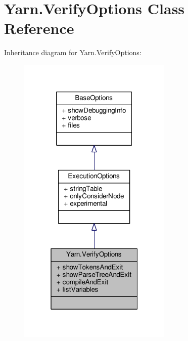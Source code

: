 \hypertarget{a00182}{\section{Yarn.\-Verify\-Options Class Reference}
\label{a00182}
}


Inheritance diagram for Yarn.\-Verify\-Options\-:
\nopagebreak
\begin{figure}[H]
\begin{center}
\leavevmode
\includegraphics[width=208pt]{a00720}
\end{center}
\end{figure}


